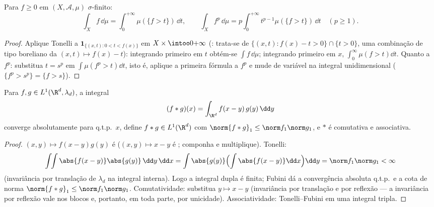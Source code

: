 \begin{proposition}\label{prop:b3:product:layercake}
Para $f \geq 0$  em $(X, \mathcal A, \mu)$ $\sigma$-finito:
\[
\int_X f\,\dd\mu = \int_0^{+\infty}\mu(\{f > t\})\,\dd t,
\qquad
\int_X f^p\,\dd\mu = p\int_0^{+\infty}t^{p-1}\mu(\{f >
t\})\,\dd t \quad (p \geq 1).
\]
\end{proposition}

\begin{proof}
Aplique Tonelli a $\mathbf 1_{\{(x,t) : 0 < t < f(x)\}}$ em $X
\times \intoo0{+\infty}$ (: trata-se de $\{(x,t): f(x) - t
> 0\}\cap\{t > 0\}$, uma
combinação de tipo boreliano da  $(x,t)\mapsto f(x) - t$): integrando
primeiro em $t$ obtém-se $\int f\,\dd\mu$; integrando primeiro em $x$, $\int_0^\infty\mu(f >
t)\dd t$.
Quanto a $f^p$: substitua $t = s^p$ em $\int\mu(f^p > t)
\dd t$, isto é, aplique a primeira
fórmula a $f^p$ e mude de variável na integral unidimensional
($\{f^p > s^p\} =
\{f > s\}$).
\end{proof}

\begin{theorem}[Convolução em $L^1$]\label{thm:b3:product:convolution}
Para $f, g \in L^1(\R^d, \lambda_d)$, a integral
\[
(f * g)(x) = \int_{\R^d} f(x - y)\,g(y)\,\dd y
\]
converge absolutamente para q.t.p.\ $x$, define $f * g \in
L^1(\R^d)$ com $\norm{f*g}_1 \leq \norm f_1\norm g_1$, e
$*$ é comutativa e associativa.
\end{theorem}

\begin{proof}
$(x, y) \mapsto f(x-y)g(y)$ é  ($ (x,y)\mapsto x -
y$ é ; componha e multiplique). Tonelli:
\[
\int\!\!\int \abs{f(x-y)}\abs{g(y)}\,\dd y\,\dd x
= \int\abs{g(y)}\Bigl(\int\abs{f(x - y)}\dd x\Bigr)\dd y
= \norm f_1\norm g_1 < \infty
\]
(invariância por translação de $\lambda_d$ na integral interna). Logo a
integral dupla é finita; Fubini dá a convergência absoluta q.t.p.\ e a
cota de norma $\norm{f*g}_1 \leq \norm
f_1\norm g_1$. Comutatividade: substitua $y \mapsto x - y$ (invariância por
translação e por reflexão --- a invariância por reflexão vale nos
blocos e, portanto, em toda parte, por unicidade). Associatividade:
Tonelli--Fubini em uma integral tripla.
\end{proof}

